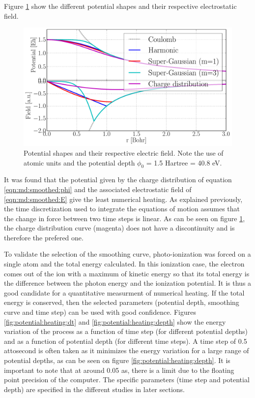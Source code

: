 Figure \ref{fig:potential:shapes} show the different potential shapes and their
respective electrostatic field.

\begin{figure}
 \centering
 \includegraphics[width=\figurewidth]{figures/potential_shapes}
 \caption{\label{fig:potential:shapes}Potential shapes and their respective
          electric field. Note the use of atomic units and the potential depth
          $\phi_0$ = 1.5 Hartree = 40.8 eV.}
\end{figure}

It was found that the potential given by the charge distribution of equation
\eqref{eqn:md:smoothed:phi} and the associated electrostatic field of
\eqref{eqn:md:smoothed:E} give the 
least numerical heating. As explained
previously, the time discretization used to integrate the equations of motion
assumes that the change in force between two time steps is linear. As can be
seen on figure \ref{fig:potential:shapes}, the charge distribution curve
(magenta) does not have a discontinuity and is therefore the prefered one.

To validate the selection of the smoothing curve, photo-ionization was forced
on a single atom and the total energy calculated. In this ionization case, the
electron comes out of the ion with a maximum of kinetic energy so that
its total energy is the difference between the photon energy and the ionization
potential. It is thus a
good candidate %
for a quantitative measurment of numerical heating.
If the total
energy is conserved, then the selected parameters (potential depth, smoothing
curve and time step) can be used with good confidence. Figures
\ref{fig:potential:heating:dt} and \ref{fig:potential:heating:depth} show the
energy variation of the process as a function of time step (for different
potential %
depths) and as a function of potential depth (for different time 
steps).
A time step of 0.5 attosecond is often taken as
it minimizes the energy variation for a large
range of potential depths, as can be seen on figure
\ref{fig:potential:heating:depth}. 
%
%
It is important to note that at around 0.05 as, there is a 
limit due to the floating point precision of the computer. The specific
parameters (time step and potential depth) are specified in the different
studies in later sections.

